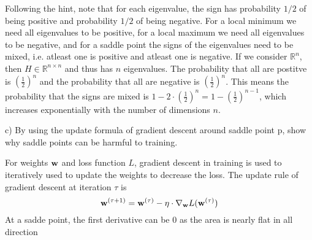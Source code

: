 \documentclass[a4paper]{article}
\newcommand{\R}{\mathbb{R}}
\newcommand{\1}{\mathbbm{1}}
\newcommand{\<}{\langle}
\renewcommand{\>}{\rangle}
\begin{document}
\begin{ans}
Following the hint, note that for each eigenvalue, the sign has probability $1/2$ of being positive and probability $1/2$ of being negative. For a local minimum we need all eigenvalues to be positive, for a local maximum we need all eigenvalues to be negative, and for a saddle point the signs of the eigenvalues need to be mixed, i.e. atleast one is positive and atleast one is negative. If we consider $\R^n$, then $H \in \R^{n \times n}$ and thus has $n$ eigenvalues. The probability that all are postitve is $(\frac12)^n$ and the probability that all are negative is $(\frac12)^n$. This means the probability that the signs are mixed is $1 - 2 \cdot (\frac12)^n = 1 - (\frac12)^{n-1}$, which increases exponentially with the number of dimensions $n$.
\end{ans}

c) By using the update formula of gradient descent around saddle point p, show why saddle points can be harmful to training.


\begin{ans}
For weights $\bold w$ and loss function $L$, gradient descent in training is used to iteratively used to update the weights to decrease the loss. The update rule of gradient descent at iteration $\tau$ is
$$\bold w^{(\tau + 1)} = \bold w^{(\tau)} - \eta \cdot \nabla_{\bold w} L(\bold w^{(\tau)})$$
At a sadde point, the first derivative can be 0 as the area is nearly flat in all direction
\end{ans}
\end{document}
